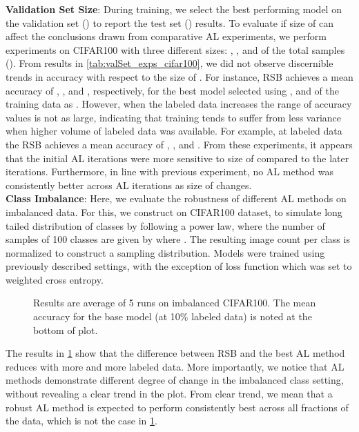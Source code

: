 \documentclass[10pt,twocolumn,letterpaper]{article}
\begin{document}
\noindent \textbf{Validation Set Size}: During training, we select the best performing model on the validation set () to report the test set () results. To evaluate if size of  can affect the conclusions drawn from comparative AL experiments, we perform experiments on CIFAR100 with three different  sizes: , , and  of the total samples ().
From results in \cref{tab:valSet_exps_cifar100}, we did not observe discernible trends in accuracy with respect to the size of . For instance, RSB achieves a mean accuracy of , , and , respectively, for the best model selected using ,  and  of the training data as . However, when the labeled data increases the range of accuracy values is not as large, indicating that training tends to suffer from less variance when higher volume of labeled data was available. For example, at  labeled data the RSB achieves a mean accuracy of , , and .  From these experiments, it appears that the initial AL iterations were more sensitive to size of  compared to the later iterations. Furthermore, in line with previous experiment, no AL method was consistently better across AL iterations as size of  changes.\\
\noindent \textbf{Class Imbalance}: Here, we evaluate the robustness of different AL methods on imbalanced data. For this, we construct  on CIFAR100 dataset, to simulate long tailed distribution of classes by following a power law, where the number of samples of 100 classes are given by  where . The resulting image count per class is normalized to construct a sampling distribution. Models were trained using previously described settings, with the exception of loss function which was set to weighted cross entropy. 
\begin{figure}
\begin{center}
  \vspace{-2em}
\end{center}
    \caption{Results are average of 5 runs on imbalanced CIFAR100. The mean accuracy for the base model (at 10\% labeled data) is noted at the bottom of plot.}
    
\label{fig:class_imbalance_cif100_exp}
  \vspace{-1em}
\end{figure}

The results in \cref{fig:class_imbalance_cif100_exp} show that the difference between RSB and the best AL method reduces with more and more labeled data. More importantly, we notice that AL methods demonstrate different degree of change in the imbalanced class setting, without revealing a clear trend in the plot. From clear trend, we mean that a robust AL method is expected to perform consistently best across all fractions of the data, which is not the case in \cref{fig:class_imbalance_cif100_exp}.
\end{document}
